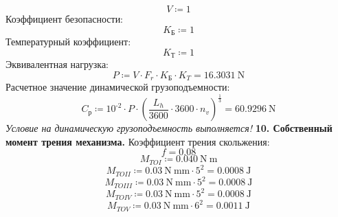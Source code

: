 \documentclass{article}
\newcommand{\defeq}{\coloneq} %
\begin{document}
\begin{equation*}
V \defeq 1
\end{equation*}
\colorbox[HTML]{000000}{Коэффициент безопасности:}\newline
\begin{equation*}
K_{Б} \defeq 1
\end{equation*}
\colorbox[HTML]{000000}{Температурный коэффициент:}\newline
\begin{equation*}
K_{Т} \defeq 1
\end{equation*}
\colorbox[HTML]{000000}{Эквивалентная нагрузка:}\newline
\begin{equation*}
P \defeq V \cdot F_{r} \cdot K_{Б} \cdot K_{T} = {16.3031 \: \mathrm{N}}
\end{equation*}
\colorbox[HTML]{000000}{Расчетное значение динамической грузоподъемности:}\newline
\begin{equation*}
C_{р} \defeq 10^{ \operatorname{-} 2} \cdot P \cdot \left( \frac{L_{h}}{3600} \cdot 3600 \cdot n_{v} \right)^{\frac{1}{3}} = {60.9296 \: \mathrm{N}}
\end{equation*}
\colorbox[HTML]{FFFF80}{\textit{Условие на динамическую грузоподъемность выполняется!}}\newline
\colorbox[HTML]{000000}{\textbf{10. Собственный момент трения механизма.}}\newline
\colorbox[HTML]{000000}{Коэффициент трения скольжения:}\newline
\begin{equation*}
f = {0.08}
\end{equation*}
\begin{equation*}
M_{TOI} \defeq 0.040 \: \mathrm{N} \: \mathrm{m}
\end{equation*}
\begin{equation*}
M_{TOII} \defeq 0.03 \: \mathrm{N} \: \mathrm{mm} \cdot 5^{2} = {0.0008 \: \mathrm{J}}
\end{equation*}
\begin{equation*}
M_{TOIII} \defeq 0.03 \: \mathrm{N} \: \mathrm{mm} \cdot 5^{2} = {0.0008 \: \mathrm{J}}
\end{equation*}
\begin{equation*}
M_{TOIV} \defeq 0.03 \: \mathrm{N} \: \mathrm{mm} \cdot 5^{2} = {0.0008 \: \mathrm{J}}
\end{equation*}
\begin{equation*}
M_{TOV} \defeq 0.03 \: \mathrm{N} \: \mathrm{mm} \cdot 6^{2} = {0.0011 \: \mathrm{J}}
\end{equation*}
\end{document}
